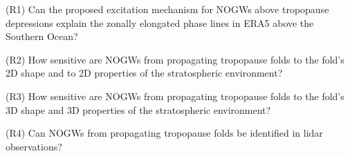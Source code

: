 \begin{tcolorbox}[]
    (R1) Can the proposed excitation mechanism for NOGWs above tropopause depressions explain the zonally elongated phase lines in ERA5 above the Southern Ocean?
\end{tcolorbox}




\begin{tcolorbox}[]
    (R2) How sensitive are NOGWs from propagating tropopause folds to the fold's 2D shape and to 2D properties of the stratospheric environment?
\end{tcolorbox}

\begin{tcolorbox}[]
    (R3) How sensitive are NOGWs from propagating tropopause folds to the fold's 3D shape and 3D properties of the stratospheric environment?
\end{tcolorbox}

\begin{tcolorbox}[]
    (R4) Can NOGWs from propagating tropopause folds be identified in lidar observations?
\end{tcolorbox}










